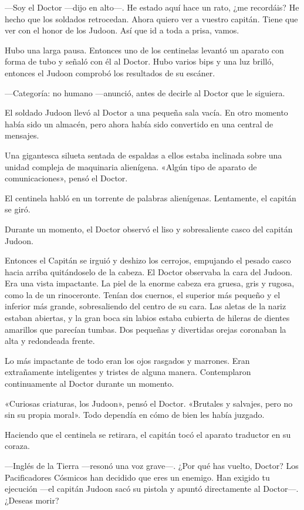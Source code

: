 ---Soy el Doctor ---dijo en alto---. He estado aquí hace un rato, ¿me
recordáis? He hecho que los soldados retrocedan. Ahora quiero ver a
vuestro capitán. Tiene que ver con el honor de los Judoon. Así que id a
toda a prisa, vamos.

Hubo una larga pausa. Entonces uno de los centinelas levantó un aparato
con forma de tubo y señaló con él al Doctor. Hubo varios bips y una luz
brilló, entonces el Judoon comprobó los resultados de su escáner.

---Categoría: no humano ---anunció, antes de decirle al Doctor que le
siguiera.

El soldado Judoon llevó al Doctor a una pequeña sala vacía. En otro
momento había sido un almacén, pero ahora había sido convertido en una
central de mensajes.

Una gigantesca silueta sentada de espaldas a ellos estaba inclinada
sobre una unidad compleja de maquinaria alienígena. «Algún tipo de
aparato de comunicaciones», pensó el Doctor.

El centinela habló en un torrente de palabras alienígenas. Lentamente,
el capitán se giró.

Durante un momento, el Doctor observó el liso y sobresaliente casco del
capitán Judoon.

Entonces el Capitán se irguió y deshizo los cerrojos, empujando el
pesado casco hacia arriba quitándoselo de la cabeza. El Doctor observaba
la cara del Judoon. Era una vista impactante. La piel de la enorme
cabeza era gruesa, gris y rugosa, como la de un rinoceronte. Tenían dos
cuernos, el superior más pequeño y el inferior más grande, sobresaliendo
del centro de su cara. Las aletas de la nariz estaban abiertas, y la
gran boca sin labios estaba cubierta de hileras de dientes amarillos que
parecían tumbas. Dos pequeñas y divertidas orejas coronaban la alta y
redondeada frente.

Lo más impactante de todo eran los ojos rasgados y marrones. Eran
extrañamente inteligentes y tristes de alguna manera. Contemplaron
continuamente al Doctor durante un momento.

«Curiosas criaturas, los Judoon», pensó el Doctor. «Brutales y salvajes,
pero no sin su propia moral». Todo dependía en cómo de bien les había
juzgado.

Haciendo que el centinela se retirara, el capitán tocó el aparato
traductor en su coraza.

---Inglés de la Tierra ---resonó una voz grave---. ¿Por qué has vuelto,
Doctor? Los Pacificadores Cósmicos han decidido que eres un enemigo.
Han exigido tu ejecución ---el capitán Judoon sacó su pistola y apuntó
directamente al Doctor---. ¿Deseas morir?